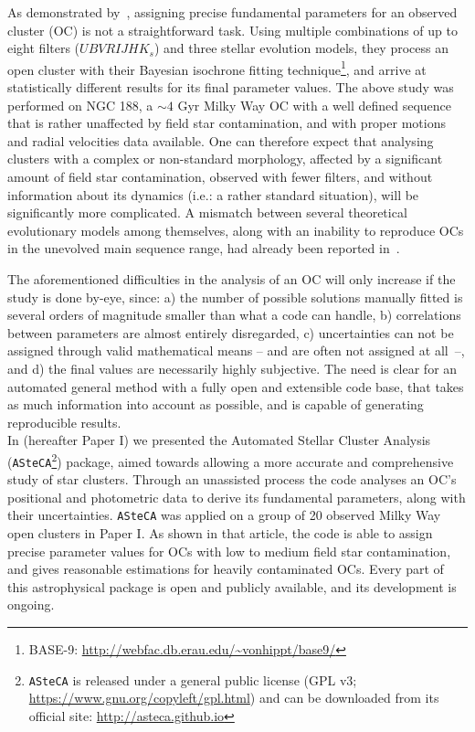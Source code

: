 \documentclass[a4paper,fleqn,usenatbib]{mnras}
\begin{document}
As demonstrated by~\cite{Hills_2015}, assigning precise fundamental
parameters for an observed cluster (OC) is not a straightforward task. Using
multiple combinations of up to eight filters ($UBVRIJHK_s$) and three stellar
evolution models, they process an open cluster with their Bayesian isochrone
fitting technique\footnote{BASE-9: 
\url{http://webfac.db.erau.edu/~vonhippt/base9/}}, and arrive at statistically
different results for its final parameter values.
%
The above study was performed on NGC 188, a ${\sim}4$ Gyr Milky Way OC with a
well defined sequence that is rather unaffected by field star contamination, and
with proper motions and radial velocities data available.
One can therefore expect that analysing clusters with a complex or non-standard
morphology, affected by a significant amount of field star contamination,
observed with fewer filters, and without information about its dynamics (i.e.:
a rather standard situation), will be significantly more complicated.
%
A mismatch between several theoretical evolutionary models among themselves,
along with an inability to reproduce OCs in the unevolved main sequence
range, had already been reported in~\cite{Grocholski_2003}.

The aforementioned difficulties in the analysis of an OC will only increase if
the study is done by-eye, since: a) the number of possible solutions manually
fitted is several orders of magnitude smaller than what a code can
handle, b) correlations between parameters are almost entirely disregarded, c)
uncertainties can not be assigned through valid mathematical
means -- and are often not assigned at \mbox{all --}, and d) the final values
are necessarily highly subjective.
%
The need is clear for an automated general method with a fully open and
extensible code base, that takes as much information into account as possible,
and is capable of generating reproducible results.\\

In \cite{Perren_2015} (hereafter Paper I) we presented the Automated Stellar
Cluster Analysis
(\texttt{ASteCA}\footnote{\texttt{ASteCA} is released under a general public
license (GPL v3; \url{https://www.gnu.org/copyleft/gpl.html}) and
can be downloaded from its official site: \url{http://asteca.github.io}})
package, aimed towards allowing a more accurate and comprehensive study of star
clusters.
Through an unassisted process the code analyses an OC's positional and
photometric data to derive its fundamental parameters, along with their
uncertainties.
\texttt{ASteCA} was applied on a group of 20 observed Milky Way open clusters
in Paper I. As shown in that article, the code is able to assign precise
parameter values for OCs with low to medium field star contamination, and gives
reasonable estimations for heavily contaminated OCs.
Every part of this astrophysical package is open and publicly available, and its
development is ongoing.
\end{document}
